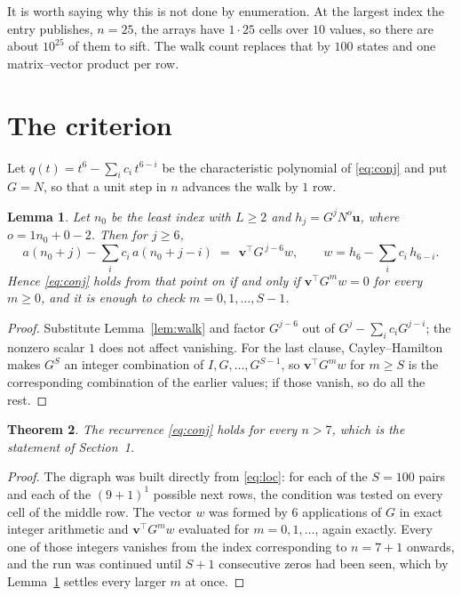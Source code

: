 \documentclass[11pt,a4paper]{article}
\theoremstyle{plain}
\newtheorem{theorem}{Theorem}
\newtheorem{lemma}[theorem]{Lemma}
\theoremstyle{definition}
\begin{document}
It is worth saying why this is not done by enumeration. At the largest index the entry
publishes, $n=25$, the arrays have $1\cdot25$ cells over
$10$ values, so there are about $10^{25}$ of them to sift. The
walk count replaces that by $100$ states and one matrix--vector product per row.
\section{The criterion}

Let $q(t)=t^{6}-\sum_i c_i\,t^{6-i}$ be the characteristic polynomial of
\eqref{eq:conj} and put $G=N$, so that a unit step in $n$ advances the walk by
$1$ row.

\begin{lemma}\label{lem:crit}
Let $n_0$ be the least index with $L\ge2$ and $h_j=G^{j}N^{o}\mathbf{u}$, where
$o=1n_0+0-2$. Then for $j\ge6$,
\[
a(n_0+j)-\sum_i c_i\,a(n_0+j-i)\;=\;\,\mathbf{v}^{\!\top}G^{\,j-6}w,
\qquad w=h_{6}-\sum_i c_i\,h_{6-i} .
\]
Hence \eqref{eq:conj} holds from that point on if and only if
$\mathbf{v}^{\!\top}G^{m}w=0$ for every $m\ge0$, and it is enough to check
$m=0,1,\dots,S-1$.
\end{lemma}

\begin{proof}
Substitute Lemma~\ref{lem:walk} and factor $G^{j-6}$ out of
$G^{j}-\sum_ic_iG^{j-i}$; the nonzero scalar $1$ does not affect
vanishing. For the last clause, Cayley--Hamilton makes $G^{S}$ an integer combination of
$I,G,\dots,G^{S-1}$, so $\mathbf{v}^{\!\top}G^{m}w$ for $m\ge S$ is the corresponding
combination of the earlier values; if those vanish, so do all the rest.
\end{proof}

\begin{theorem}
The recurrence \eqref{eq:conj} holds for every $n>7$, which is the statement of
Section~1.
\end{theorem}

\begin{proof}
The digraph was built directly from \eqref{eq:loc}: for each of the $S=100$ pairs and each
of the $(9+1)^{1}$ possible next rows, the condition was tested on every cell of
the middle row. The vector $w$ was formed by $6$ applications of $G$ in exact integer
arithmetic and $\mathbf{v}^{\!\top}G^{m}w$ evaluated for $m=0,1,\dots$, again exactly.
Every one of those integers vanishes from the index corresponding to $n=7+1$ onwards,
and the run was continued until $S+1$ consecutive zeros had been seen, which by
Lemma~\ref{lem:crit} settles every larger $m$ at once.
\end{proof}
\end{document}
